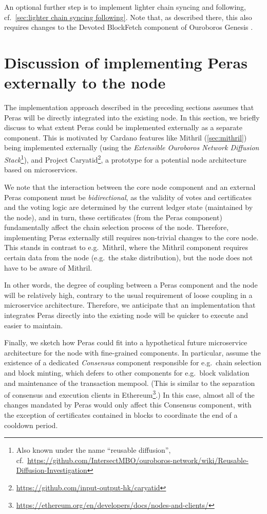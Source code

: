 An optional further step is to implement lighter chain syncing and following, cf.~\cref{sec:lighter chain syncing following}.
Note that, as described there, this also requires changes to the Devoted BlockFetch component of Ouroboros Genesis \parencite{genesis-implementation-documentation}.

\section{Discussion of implementing Peras externally to the node}

The implementation approach described in the preceding sections assumes that Peras will be directly integrated into the existing node.
In this section, we briefly discuss to what extent Peras could be implemented externally as a separate component.
This is motivated by Cardano features like Mithril (\cref{sec:mithril}) being implemented externally (using the \emph{Extensible Ouroboros Network Diffusion Stack}\footnote{Also known under the name \enquote{reusable diffusion}, cf.~\url{https://github.com/IntersectMBO/ouroboros-network/wiki/Reusable-Diffusion-Investigation}}), and Project Caryatid\footnote{\url{https://github.com/input-output-hk/caryatid}}, a prototype for a potential node architecture based on microservices.

We note that the interaction between the core node component and an external Peras component must be \emph{bidirectional}, as the validity of votes and certificates and the voting logic are determined by the current ledger state (maintained by the node), and in turn, these certificates (from the Peras component) fundamentally affect the chain selection process of the node.
Therefore, implementing Peras externally still requires non-trivial changes to the core node.
This stands in contrast to e.g.\ Mithril, where the Mithril component requires certain data from the node (e.g.\ the stake distribution), but the node does not have to be aware of Mithril.

In other words, the degree of coupling between a Peras component and the node will be relatively high, contrary to the usual requirement of loose coupling in a microservice architecture.
Therefore, we anticipate that an implementation that integrates Peras directly into the existing node will be quicker to execute and easier to maintain.

\medskip%
Finally, we sketch how Peras could fit into a hypothetical future microservice architecture for the node with fine-grained components.
In particular, assume the existence of a dedicated \emph{Consensus} component responsible for e.g.\ chain selection and block minting, which defers to other components for e.g.~block validation and maintenance of the transaction mempool.
(This is similar to the separation of consensus and execution clients in Ethereum\footnote{\url{https://ethereum.org/en/developers/docs/nodes-and-clients/}}.)
In this case, almost all of the changes mandated by Peras would only affect this Consensus component, with the exception of certificates contained in blocks to coordinate the end of a cooldown period.


